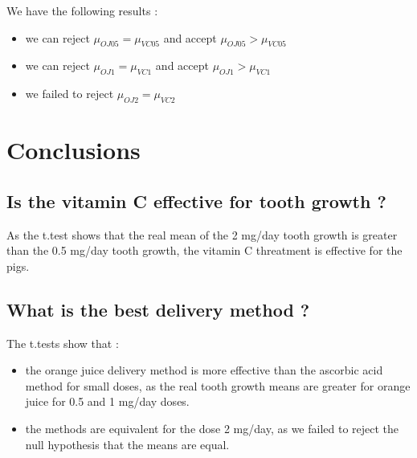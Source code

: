 \documentclass[a4paper, 10pt]{article}\usepackage[]{graphicx}\usepackage[]{color}
\begin{document}
We have the following results :
\begin{itemize}
    \item we can reject  $\mu_{OJ05} = \mu_{VC05}$ and accept  $\mu_{OJ05} > \mu_{VC05}$
    \item we can reject  $\mu_{OJ1} = \mu_{VC1}$ and accept  $\mu_{OJ1} > \mu_{VC1}$
    \item we failed to reject  $\mu_{OJ2} = \mu_{VC2}$
\end{itemize}
\section{Conclusions}
\subsection{Is the vitamin C effective for tooth growth ?}
As the t.test shows that the real mean of the 2 mg/day tooth growth is greater than the 0.5 mg/day tooth growth, the vitamin C threatment is effective for the pigs.
\subsection{What is the best delivery method ?}
The t.tests show that :
\begin{itemize}
    \item the orange juice delivery method is more effective than the ascorbic acid method for small doses, as the real tooth growth means are greater for orange juice for 0.5 and 1 mg/day doses.
    \item the methods are equivalent for the dose 2 mg/day, as we failed to reject the null hypothesis that the means are equal.
\end{itemize}
\end{document}
